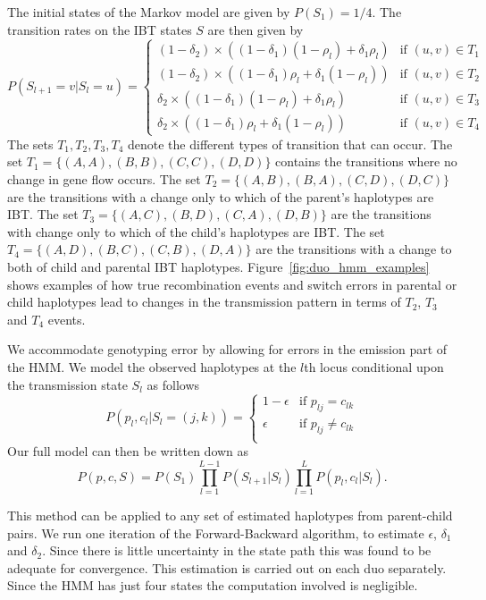 The initial states of the Markov model are given by $P(S_1) = 1/4$. The transition rates on the IBT states $S$ are then given by 
\small
\[ P(S_{l+1}=v|S_l=u) = \left\{ \begin{array}{ll}
    (1-\delta_2) \times \left((1-\delta_1)(1-\rho_l) + \delta_1\rho_l \right)& \mbox{if } (u,v) \in T_1\\
    (1-\delta_2) \times \left((1-\delta_1)\rho_l + \delta_1(1-\rho_l) \right) & \mbox{if } (u,v) \in T_2\\
    \delta_2 \times \left( (1-\delta_1)(1-\rho_l) + \delta_1\rho_l \right) &  \mbox{if } (u,v) \in T_3 \\
    \delta_2 \times \left( (1-\delta_1)\rho_l + \delta_1(1-\rho_l) \right)&  \mbox{if } (u,v) \in T_4   
\end{array} \right. \] 
\normalsize
The sets $T_1, T_2, T_3, T_4$ denote the different types of transition that can occur. The set $T_1 = \{(A,A), (B,B), (C,C), (D,D)\}$ contains the transitions where no change in gene flow occurs. The set $T_2 = \{(A,B), (B,A), (C,D), (D,C)\}$ are the transitions with a change only to  which of the parent's haplotypes are IBT. The set $T_3 = \{(A,C),(B,D),(C,A),(D,B)\}$ are the transitions with change only to which of the child's haplotypes are IBT. The set $T_4 = \{(A,D),(B,C),(C,B),(D,A)\}$ are the transitions with a change to both of child and parental IBT haplotypes. Figure~\ref{fig:duo_hmm_examples} shows examples of how true recombination events and switch errors in parental or child haplotypes lead to changes in the transmission pattern in terms of $T_2$, $T_3$ and $T_4$ events.

We accommodate genotyping error by allowing for errors in the emission part of the HMM. We model the observed haplotypes at the $l$th locus conditional upon the transmission state $S_l$ as follows
\[ P(p_l, c_l | S_l=(j,k)) = \left\{ \begin{array}{ll}
1-\epsilon & \mbox{if } p_{lj}=c_{lk}\\
\epsilon & \mbox{if } p_{lj}\neq c_{lk}\\
\end{array} \right. \] 
Our full model can then be written down as 
\[P(p, c, S) = P(S_1)\prod_{l=1}^{L-1} P(S_{l+1}|S_l) \prod_{l=1}^L P(p_l, c_l | S_l).\]

This method can be applied to any set of estimated haplotypes from parent-child pairs. We run one iteration of the Forward-Backward algorithm, to estimate $\epsilon$, $\delta_1$ and $\delta_2$.   Since there is little uncertainty in the state path this was found to be adequate for convergence. This estimation is carried out on each duo separately. Since the HMM has just four states the computation involved is negligible.

